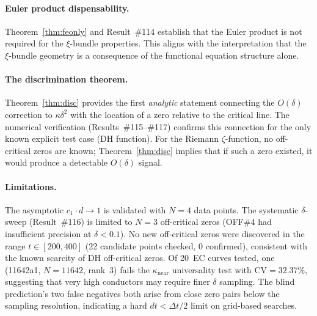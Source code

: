 \documentclass[11pt, a4paper]{article}
\theoremstyle{plain}
\theoremstyle{definition}
\begin{document}
\paragraph{Euler product dispensability.}
Theorem~\ref{thm:feonly} and Result~\#114 establish that the Euler
product is not required for the $\xi$-bundle properties.  This aligns
with the interpretation that the $\xi$-bundle geometry is a consequence
of the functional equation structure alone.

\paragraph{The discrimination theorem.}
Theorem~\ref{thm:disc} provides the first \emph{analytic} statement
connecting the $O(\delta)$ correction to $\kappa\delta^{2}$ with the
location of a zero relative to the critical line.  The numerical
verification (Results~\#115--\#117) confirms this connection for the
only known explicit test case (DH function).  For the Riemann
$\zeta$-function, no off-critical zeros are known; Theorem~\ref{thm:disc}
implies that if such a zero existed, it would produce a detectable
$O(\delta)$ signal.

\paragraph{Limitations.}
The asymptotic $c_{1}\cdot d \to 1$ is validated with $N=4$ data points.
The systematic $\delta$-sweep (Result~\#116) is limited to $N=3$
off-critical zeros (OFF\#4 had insufficient precision at $\delta<0.1$).
No new off-critical zeros were discovered in the range $t\in[200,400]$
(22 candidate points checked, 0 confirmed), consistent with the
known scarcity of DH off-critical zeros.
Of 20~EC curves tested, one (11642a1, $N=11642$, rank~3) fails the
$\kappa_{\mathrm{near}}$ universality test with CV${}=32.37\%$,
suggesting that very high conductors may require finer $\delta$ sampling.
The blind prediction's two false negatives both arise from close zero
pairs below the sampling resolution, indicating a hard
$dt < \Delta t/2$ limit on grid-based searches.
\end{document}
